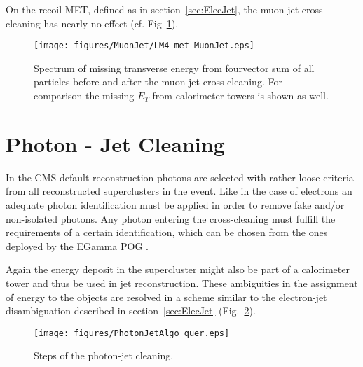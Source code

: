 \documentclass{cmspaper}
\begin{document}
On the recoil MET, defined as in section~\ref{sec:ElecJet}, the muon-jet cross
cleaning has nearly no effect (cf. Fig~\ref{fig:met_MuonJet}).

\begin{figure}[hb]
\begin{center}
    \texttt{[image: figures/MuonJet/LM4\_met\_MuonJet.eps]}
    \caption{Spectrum of missing transverse energy from fourvector sum of all
    particles before and after the muon-jet cross cleaning. For comparison the
    missing $E_T$ from calorimeter towers is shown as well.}
\label{fig:met_MuonJet}
\end{center}
\end{figure}

\clearpage


\section{Photon - Jet Cleaning}
In the CMS default reconstruction photons are selected with rather loose
criteria from all reconstructed superclusters in the event. Like in the case of
electrons an adequate photon identification must be applied in order to remove
fake and/or non-isolated photons. Any photon entering the cross-cleaning must
fulfill the requirements of a certain identification, which can be chosen from
the ones deployed by the EGamma POG \cite{photonID}. 

Again the energy deposit in the supercluster might also be part of a
calorimeter tower and thus be used in jet reconstruction. These ambiguities in
the assignment of energy to the objects are resolved in a scheme similar to the
electron-jet disambiguation described in section~\ref{sec:ElecJet}
(Fig.~\ref{fig:PJCleaning}).


\begin{figure}[hbt]
\begin{center}
\texttt{[image: figures/PhotonJetAlgo\_quer.eps]}
\caption{Steps of the photon-jet cleaning.}
\label{fig:PJCleaning}
\end{center}
\end{figure}
\end{document}
